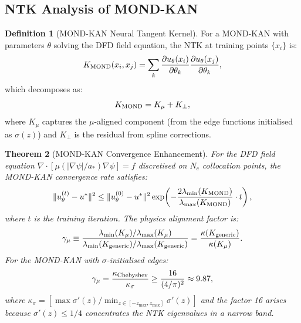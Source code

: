\documentclass[11pt]{article}
\newtheorem{theorem}{Theorem}[section]
\theoremstyle{definition}
\newtheorem{definition}[theorem]{Definition}
\theoremstyle{remark}
\begin{document}
\subsection{NTK Analysis of MOND-KAN}
\label{sec:mond-kan-ntk}

\begin{definition}[MOND-KAN Neural Tangent Kernel]
\label{def:mond-kan-ntk}
For a MOND-KAN with parameters $\theta$ solving the DFD field equation,
the NTK at training points $\{x_i\}$ is:
\begin{equation}
  K_{\rm MOND}(x_i, x_j) = \sum_k \frac{\partial u_\theta(x_i)}{\partial \theta_k}
  \frac{\partial u_\theta(x_j)}{\partial \theta_k},
  \label{eq:mond-ntk}
\end{equation}
which decomposes as:
\begin{equation}
  K_{\rm MOND} = K_\mu + K_\perp,
  \label{eq:ntk-decomposition}
\end{equation}
where $K_\mu$ captures the $\mu$-aligned component (from the edge functions
initialised as $\sigma(z)$) and $K_\perp$ is the residual from spline
corrections.
\end{definition}

\begin{theorem}[MOND-KAN Convergence Enhancement]
\label{thm:mond-kan-convergence}
For the DFD field equation
$\nabla\cdot[\mu(|\nabla\psi|/a_*)\nabla\psi] = f$ discretised on $N_c$
collocation points, the MOND-KAN convergence rate satisfies:
\begin{equation}
  \|u_\theta^{(t)} - u^*\|^2 \leq \|u_\theta^{(0)} - u^*\|^2
  \exp\!\left(-\frac{2\lambda_{\min}(K_{\rm MOND})}{\lambda_{\max}(K_{\rm MOND})} \cdot t\right),
  \label{eq:mond-convergence}
\end{equation}
where $t$ is the training iteration. The physics alignment factor is:
\begin{equation}
  \gamma_\mu \equiv \frac{\lambda_{\min}(K_\mu)/\lambda_{\max}(K_\mu)}
  {\lambda_{\min}(K_{\rm generic})/\lambda_{\max}(K_{\rm generic})}
  = \frac{\kappa(K_{\rm generic})}{\kappa(K_\mu)}.
  \label{eq:alignment-factor}
\end{equation}
For the MOND-KAN with $\sigma$-initialised edges:
\begin{equation}
  \gamma_\mu = \frac{\kappa_{\rm Chebyshev}}{\kappa_\sigma}
  \geq \frac{16}{(4/\pi)^2} \approx 9.87,
  \label{eq:gamma-bound}
\end{equation}
where $\kappa_\sigma = [\max \sigma'(z) / \min_{z \in [-z_{\max}, z_{\max}]} \sigma'(z)]$
and the factor 16 arises because $\sigma'(z) \leq 1/4$ concentrates the
NTK eigenvalues in a narrow band.
\end{theorem}
\end{document}
